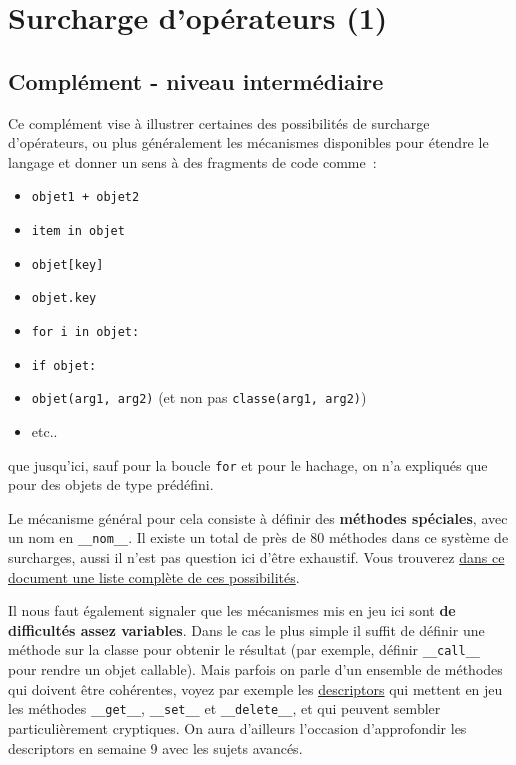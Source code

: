    
    
    
    

    

    \hypertarget{surcharge-dopuxe9rateurs-1}{%
\section{Surcharge d'opérateurs (1)}\label{surcharge-dopuxe9rateurs-1}}

    \hypertarget{compluxe9ment---niveau-intermuxe9diaire}{%
\subsection{Complément - niveau
intermédiaire}\label{compluxe9ment---niveau-intermuxe9diaire}}

    Ce complément vise à illustrer certaines des possibilités de surcharge
d'opérateurs, ou plus généralement les mécanismes disponibles pour
étendre le langage et donner un sens à des fragments de code comme~:

\begin{itemize}
\tightlist
\item
  \texttt{objet1\ +\ objet2}
\item
  \texttt{item\ in\ objet}
\item
  \texttt{objet{[}key{]}}
\item
  \texttt{objet.key}
\item
  \texttt{for\ i\ in\ objet:}
\item
  \texttt{if\ objet:}
\item
  \texttt{objet(arg1,\ arg2)} (et non pas \texttt{classe(arg1,\ arg2)})
\item
  etc..
\end{itemize}

que jusqu'ici, sauf pour la boucle \texttt{for} et pour le hachage, on
n'a expliqués que pour des objets de type prédéfini.

    Le mécanisme général pour cela consiste à définir des \textbf{méthodes
spéciales}, avec un nom en \texttt{\_\_nom\_\_}. Il existe un total de
près de 80 méthodes dans ce système de surcharges, aussi il n'est pas
question ici d'être exhaustif. Vous trouverez
\href{https://docs.python.org/3/reference/datamodel.html\#specialnames}{dans
ce document une liste complète de ces possibilités}.

    Il nous faut également signaler que les mécanismes mis en jeu ici sont
\textbf{de difficultés assez variables}. Dans le cas le plus simple il
suffit de définir une méthode sur la classe pour obtenir le résultat
(par exemple, définir \texttt{\_\_call\_\_} pour rendre un objet
callable). Mais parfois on parle d'un ensemble de méthodes qui doivent
être cohérentes, voyez par exemple les
\href{https://docs.python.org/3/reference/datamodel.html\#invoking-descriptors}{descriptors}
qui mettent en jeu les méthodes \texttt{\_\_get\_\_},
\texttt{\_\_set\_\_} et \texttt{\_\_delete\_\_}, et qui peuvent sembler
particulièrement cryptiques. On aura d'ailleurs l'occasion d'approfondir
les descriptors en semaine 9 avec les sujets avancés.

